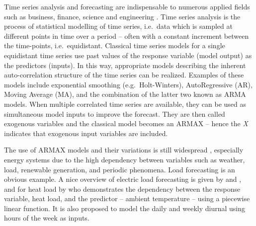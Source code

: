 Time series analysis and forecasting are indispensable to numerous applied
fields such as business, finance, science and engineering
\citep{cryer2008time}. Time series analysis is the process of statistical
modelling of time series, i.e.\ data which is sampled at different points in
time over a period -- often with a constant increment between the time-points,
i.e.\ equidistant. Classical time series models for a single equidistant time
series use past values of the response variable (model output) as the predictors
(inputs). In this way, appropriate models describing the inherent
auto-correlation structure of the time series can be realized. Examples of these
models include exponential smoothing (e.g.\ Holt-Winters), AutoRegressive (AR),
Moving Average (MA), and the combination of the latter two known as ARMA models. When
multiple correlated time series are available, they can be used as simultaneous model inputs to
improve the forecast. They are then called exogenous variables and the classical
model becomes an ARMAX -- hence the \textit{X} indicates that exogenous input variables
are included. 

The use of ARMAX models and their variations  is still widespread \citep{de200625},
especially  energy systems due to the high dependency between
variables such as weather, load, renewable generation, and periodic phenomena. Load
forecasting is an obvious example. A nice overview of electric load forecasting
is given by  and \citet{hong2016probabilistic}, and for heat
load by  who demonstrates the dependency between the
response variable, heat load, and the predictor -- ambient temperature -- using a
piecewise linear function. It is also proposed to model the daily and weekly
diurnal using hours of the week as inputs.


